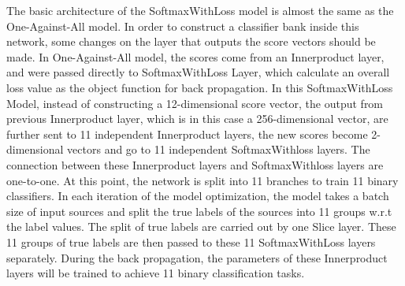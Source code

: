 The basic architecture of the SoftmaxWithLoss model is almost the same as the One-Against-All model. In order to construct a classifier bank inside this network, some changes on the layer that outputs the score vectors should be made. In One-Against-All model, the scores come from an Innerproduct layer, and were passed directly to SoftmaxWithLoss Layer, which calculate an overall loss value as the object function for back propagation. In this SoftmaxWithLoss Model, instead of constructing a 12-dimensional score vector, the output from previous Innerproduct layer, which is in this case a 256-dimensional vector, are further sent to 11 independent Innerproduct layers, the new scores become 2-dimensional vectors and go to 11 independent SoftmaxWithloss layers. The connection between these Innerproduct layers and SoftmaxWithloss layers are one-to-one. At this point, the network is split into 11 branches to train 11 binary classifiers. In each iteration of the model optimization, the model takes a batch size of input sources and split the true labels of the sources into 11 groups w.r.t the label values. The split of true labels are carried out by one Slice layer. These 11 groups of true labels are then passed to these 11 SoftmaxWithLoss layers separately. During the back propagation, the parameters of these Innerproduct layers will be trained to achieve 11 binary classification tasks. 

